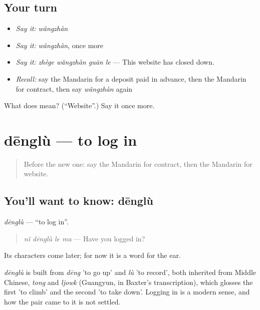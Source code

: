 \subsection*{Your turn}
\begin{itemize}
\raggedright
  \item \emph{Say it:} \emph{wǎngzhàn}
  \item \emph{Say it:} \emph{wǎngzhàn}, once more
  \item \emph{Say it:} \emph{zhège wǎngzhàn guān le} — This website has closed down.
  \item \emph{Recall:} say the Mandarin for a deposit paid in advance, then the Mandarin for contract, then say \emph{wǎngzhàn} again
\end{itemize}

\begin{tcolorbox}[breakable,colback=teal!4,colframe=teal!35!black,title={Before you move on}]
What does  mean? (\textquotedblleft{}Website\textquotedblright{}.) Say it once more.
\end{tcolorbox}
\section[dēnglù]{dēnglù — to log in}

\label{lesson:ZH-C204-denglu}



\begin{quote}
Before the new one: say the Mandarin for contract, then the Mandarin for website.
\end{quote}

\subsection*{You'll want to know: dēnglù}
\emph{dēnglù} — \textquotedblleft{}to log in\textquotedblright{}.

\begin{quote}
\emph{nǐ dēnglù le ma} — Have you logged in?
\end{quote}

Its characters come later; for now it is a word for the ear.

\begin{cousinweb}
\emph{dēnglù} is built from \emph{dēng} 'to go up' and \emph{lù} 'to record', both inherited from Middle Chinese, \emph{tong} and \emph{ljowk} (Guangyun, in Baxter's transcription), which glosses the first 'to climb' and the second 'to take down'. Logging in is a modern sense, and how the pair came to it is not settled.
\end{cousinweb}

